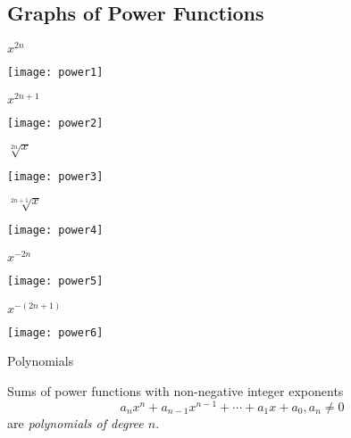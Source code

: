 \documentclass[Lecture.tex]{subfiles}
\begin{document}
\subsection{Graphs of Power Functions}

\begin{frame}{$x^{2n}$}
  \begin{center}
    \texttt{[image: power1]}
  \end{center}
\end{frame}

\begin{frame}{$x^{2n + 1}$}
  \begin{center}
    \texttt{[image: power2]}
  \end{center}
\end{frame}

\begin{frame}{$\sqrt[2n]{x}$}
  \begin{center}
    \texttt{[image: power3]}
  \end{center}
\end{frame}

\begin{frame}{$\sqrt[2n + 1]{x}$}
  \begin{center}
    \texttt{[image: power4]}
  \end{center}
\end{frame}

\begin{frame}{$x^{-2n}$}
  \begin{center}
    \texttt{[image: power5]}
  \end{center}
\end{frame}

\begin{frame}{$x^{-(2n + 1)}$}
  \begin{center}
    \texttt{[image: power6]}
  \end{center}
\end{frame}

\begin{frame}{Polynomials}
  \begin{defn}
    Sums of power functions with non-negative integer exponents
    $$a_nx^n + a_{n-1}x^{n-1} + \cdots + a_1x + a_0, a_n \neq 0$$
    are {\it polynomials of degree $n$}.
  \end{defn}

\end{frame}
\end{document}
